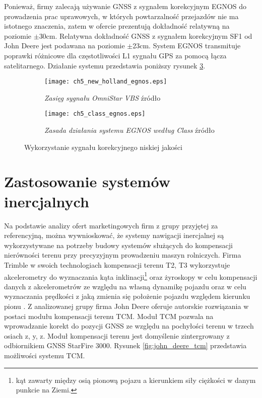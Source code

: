 Ponieważ, firmy zalecają używanie GNSS z sygnałem korekcyjnym EGNOS do prowadzenia prac uprawowych, w których powtarzalność przejazdów nie 
ma istotnego znaczenia, zatem w ofercie prezentują dokładność relatywną na poziomie $\pm$30cm. Relatywna dokładność GNSS z sygnałem korekcyjnym SF1 od John Deere 
jest podawana na poziomie $\pm$23cm. System EGNOS transmituje poprawki różnicowe dla częstotliwości L1 sygnału GPS za pomocą łącza satelitarnego. Działanie systemu 
przedstawia poniższy rysunek \ref{fig:class_egnos}.
\begin{figure}[H]
\centering
        \begin{subfigure}{0.4\textwidth}
                \centering
                \texttt{[image: ch5\_new\_holland\_egnos.eps]}
                \caption{\textit{Zasięg sygnału OmniStar VBS} źródło \cite[][strona 4]{NEW_HOLLAND_PLM}}
                \label{fig:omnistar_vbs}
        \end{subfigure}
        \begin{subfigure}{0.4\textwidth}
                \centering
                \texttt{[image: ch5\_class\_egnos.eps]}
                \caption{\textit{Zasada działania systemu EGNOS według Class} źródło \cite[][strona 26]{CLAAS_stearing_systems}}
                \label{fig:class_egnos}
        \end{subfigure}
\caption{Wykorzystanie sygnału korekcyjnego niskiej jakości}
\end{figure}
\indent 

\section{Zastosowanie systemów inercjalnych}
Na podstawie analizy ofert marketingowych firm z grupy przyjętej za referencyjną, można wywnioskować, że systemy nawigacji inercjalnej 
są wykorzystywane na potrzeby budowy systemów służących do kompensacji nierówności terenu przy precyzyjnym prowadzeniu maszyn rolniczych.
Firma Trimble w swoich technologiach kompensacji terenu T2, T3 wykorzystuje akcelerometry do wyznaczania kąta inklinacji\footnote{kąt zawarty między osią 
pionową pojazu a kierunkiem siły ciężkości w danym punkcie na Ziemi.} oraz żyroskopy w celu kompensacji danych z akcelerometrów ze względu na własną dynamikę pojazdu oraz 
w celu wyznaczania prędkości z jaką zmienia się położenie pojazdu względem kierunku pionu \cite[]{TRIMBLE}.
Z analizowanej grupy firma John Deere oferuje autorskie rozwiązania w postaci modułu kompensacji terenu TCM. Moduł TCM pozwala na wprowadzanie korekt 
do pozycji GNSS ze względu na pochyłości terenu w trzech osiach z, y, z. Moduł kompensacji terenu jest domyślenie zintergrowany z odbiornikiem GNSS StarFire 3000.
Rysunek \ref{fig:john_deere_tcm} przedstawia możliwości systemu TCM. 

